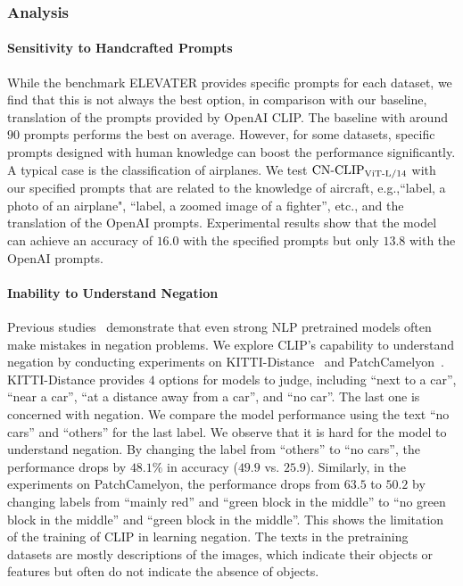 \documentclass[11pt]{article}
\begin{document}
\subsubsection{Analysis}


\paragraph{Sensitivity to Handcrafted Prompts}
While the benchmark ELEVATER provides specific prompts for each dataset, we find that this is not always the best option, in comparison with our baseline, translation of the prompts provided by OpenAI CLIP. 
The baseline with around $90$ prompts performs the best on average. 
However, for some datasets, specific prompts designed with human knowledge can boost the performance significantly. 
A typical case is the classification of airplanes. 
We test $\text{CN-CLIP}\rm_{ViT\text{-}L/14}$ with our specified prompts that are related to the knowledge of aircraft, e.g.,``{label}, a photo of an airplane", ``{label}, a zoomed image of a fighter'', etc., and the translation of the OpenAI prompts.
Experimental results show that the model can achieve an accuracy of $16.0$ with the specified prompts but only $13.8$ with the OpenAI prompts. 



\paragraph{Inability to Understand Negation}
Previous studies~\citep{negbert, bertnot} demonstrate that even strong NLP pretrained models  often make mistakes in negation problems. 
We explore CLIP's capability to understand negation by conducting experiments on KITTI-Distance~\citep{kitti} and PatchCamelyon~\citep{patchcamelyon}. 
KITTI-Distance provides $4$ options for models to judge, including ``next to a car'', ``near a car'', ``at a distance away from a car'', and ``no car''. The last one is concerned with negation. 
We compare the model performance using the text ``no cars'' and ``others'' for the last label. 
We observe that it is hard for the model to understand negation. By changing the label from ``others'' to ``no cars'', the performance drops by $48.1\%$ in accuracy ($49.9$ vs. $25.9$). 
Similarly, in the experiments on PatchCamelyon, the performance drops from $63.5$ to $50.2$ by changing labels from ``mainly red'' and ``green block in the middle'' to ``no green block in the middle'' and ``green block in the middle''. 
This shows the limitation of the training of CLIP in learning negation. 
The texts in the pretraining datasets are mostly descriptions of the images, which indicate their objects or features but often do not indicate the absence of objects. 
\end{document}
